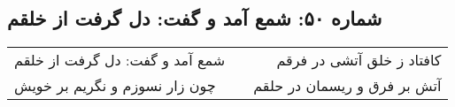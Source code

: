 \begin{center}
\section*{شماره ۵۰: شمع آمد و گفت: دل گرفت از خلقم}
\label{sec:050}
\begin{longtable}{l p{0.5cm} r}
شمع آمد و گفت: دل گرفت از خلقم
&&
کافتاد ز خلق آتشی در فرقم
\\
چون زار نسوزم و نگریم بر خویش
&&
آتش بر فرق و ریسمان در حلقم
\\
\end{longtable}
\end{center}
